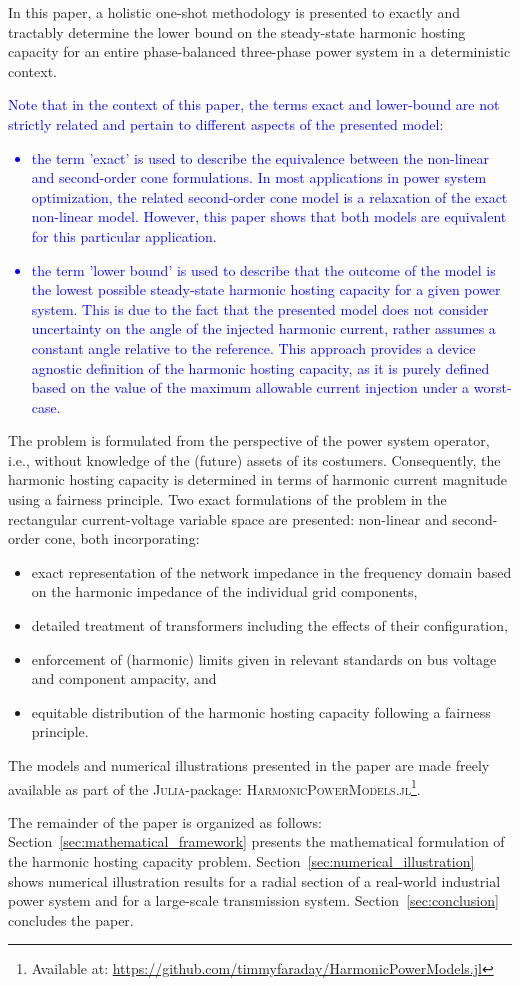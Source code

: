 In this paper, a holistic one-shot methodology is presented to exactly and tractably determine the lower bound on the steady-state harmonic hosting capacity for an entire phase-balanced three-phase power system in a deterministic context. \textcolor{blue}{Note that in the context of this paper, the terms exact and lower-bound are not strictly related and pertain to different aspects of the presented model:
\begin{itemize}
    \item the term 'exact' is used to describe the equivalence between the non-linear and second-order cone formulations. In most applications in power system optimization, the related second-order cone model is a relaxation of the exact non-linear model. However, this paper shows that both models are equivalent for this particular application.
    \item the term 'lower bound' is used to describe that the outcome of the model is the lowest possible steady-state harmonic hosting capacity for a given power system. This is due to the fact that the presented model does not consider uncertainty on the angle of the injected harmonic current, rather assumes a constant angle relative to the reference. This approach provides a device agnostic definition of the harmonic hosting capacity, as it is purely defined based on the value of the maximum allowable current injection under a worst-case.
\end{itemize}}
The problem is formulated from the perspective of the power system operator, i.e., without knowledge of the (future) assets of its costumers. Consequently, the harmonic hosting capacity is determined in terms of harmonic current magnitude using a fairness principle. Two exact formulations of the problem in the rectangular current-voltage variable space are presented: non-linear and second-order cone, both incorporating: 
\begin{itemize}
    \item exact representation of the network impedance in the frequency domain based on the harmonic impedance of the individual grid components,
    \item detailed treatment of transformers including the effects of their configuration,
    \item enforcement of (harmonic) limits given in relevant standards on bus voltage and component ampacity, and
    \item equitable distribution of the harmonic hosting capacity following a fairness principle. 
\end{itemize}
The models and numerical illustrations presented in the paper are made freely available as part of the \textsc{Julia}-package: \textsc{HarmonicPowerModels.jl}\footnote{Available at: \href{https://github.com/timmyfaraday/HarmonicPowerModels.jl}{https://github.com/timmyfaraday/HarmonicPowerModels.jl}}.

The remainder of the paper is organized as follows: Section~\ref{sec:mathematical_framework} presents the mathematical formulation of the harmonic hosting capacity problem. Section~\ref{sec:numerical_illustration} shows numerical illustration results for a radial section of a real-world industrial power system and for a large-scale transmission system. Section~\ref{sec:conclusion} concludes the paper.